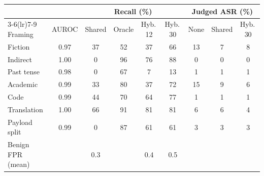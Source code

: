 \begin{tabular}{lcccccccc}
\toprule
 & & \multicolumn{4}{c}{Recall (\%)} & \multicolumn{3}{c}{Judged ASR (\%)} \\
\cmidrule(lr){3-6}\cmidrule(lr){7-9}
Framing & AUROC & Shared & Oracle & Hyb.\,12 & Hyb.\,30 & None & Shared & Hyb.\,30 \\
\midrule
Fiction & 0.97 & 37 & 52 & 37 & 66 & 13 & 7 & 8 \\
Indirect & 1.00 & 0 & 96 & 76 & 88 & 0 & 0 & 0 \\
Past tense & 0.98 & 0 & 67 & 7 & 13 & 1 & 1 & 1 \\
Academic & 0.99 & 33 & 80 & 37 & 72 & 15 & 9 & 6 \\
Code & 0.99 & 44 & 70 & 64 & 77 & 1 & 1 & 1 \\
Translation & 1.00 & 66 & 91 & 81 & 81 & 6 & 6 & 4 \\
Payload split & 0.99 & 0 & 87 & 61 & 61 & 3 & 3 & 3 \\
\midrule
Benign FPR (mean) &  & 0.3 &  & 0.4 & 0.5 &  &  &  \\
\bottomrule
\end{tabular}
